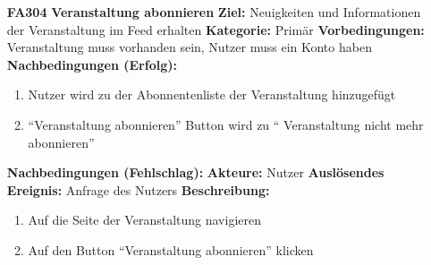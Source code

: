 \documentclass[parskip=full]{scrartcl}
\begin{document}
\begin{itemize}[nosep]
			\item[\textbf{FA304}]\textbf{Veranstaltung abonnieren}
			\newline \textbf{Ziel:} Neuigkeiten und Informationen der Veranstaltung im \gls{Feed} erhalten
			\newline \textbf{Kategorie:} Primär
			\newline \textbf{Vorbedingungen:} Veranstaltung muss vorhanden sein, Nutzer muss ein Konto haben
			\newline \textbf{Nachbedingungen (Erfolg):} 
			\begin{enumerate}[nosep]
				\item Nutzer wird zu der \gls{Abonnenten}liste der Veranstaltung hinzugefügt
				\item “Veranstaltung abonnieren” \gls{Button} wird zu “ Veranstaltung nicht mehr abonnieren” 
			\end{enumerate}
			\textbf{Nachbedingungen (Fehlschlag):}
			\newline \textbf{Akteure:} Nutzer
			\newline \textbf{Auslösendes Ereignis:} Anfrage des Nutzers
			\newline \textbf{Beschreibung:}
			\begin{enumerate}[nosep]
				\item Auf die Seite der Veranstaltung navigieren
				\item Auf den \gls{Button} “Veranstaltung abonnieren” klicken\\
			\end{enumerate}
			

\end{itemize}
\end{document}
